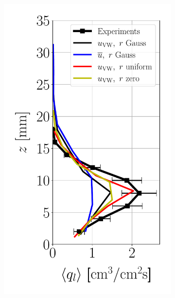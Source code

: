 \begin{figure}[h!]
\flushleft
\begin{subfigure}[b]{0.2\textwidth}
	\flushleft
   \includegraphics[scale=0.35]{./part2_developments/figures_ch6_lagrangian_JICF/params_spray_velocities/profiles/flux_along_z}
\end{subfigure}
\hspace*{0.5in}
\begin{subfigure}[b]{0.2\textwidth}
	\flushleft

\end{subfigure}
\end{figure}
